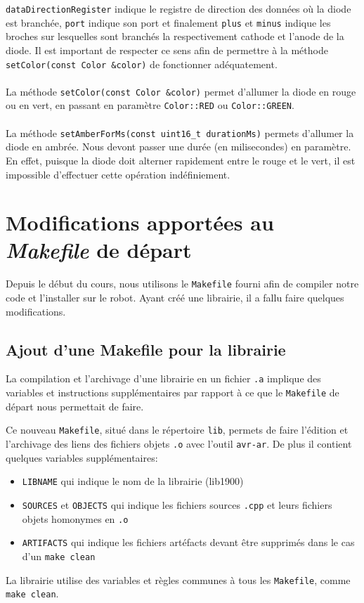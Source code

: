 \documentclass[12pt]{scrartcl}
\begin{document}
\texttt{dataDirectionRegister} indique le registre de direction des données où la
diode est branchée, \texttt{port} indique son port et finalement \texttt{plus}
et \texttt{minus} indique les broches sur lesquelles sont branchés la
respectivement cathode et l'anode de la diode. Il est important de respecter ce
sens afin de permettre à la méthode \texttt{setColor(const Color &color)} de
fonctionner adéquatement.
\\ \\
La méthode \texttt{setColor(const Color &color)} permet d'allumer la diode en rouge
ou en vert, en passant en paramètre \texttt{Color::RED} ou \texttt{Color::GREEN}.
\\ \\
La méthode \texttt{setAmberForMs(const uint16_t durationMs)} permets d'allumer la
diode en ambrée. Nous devont passer une durée (en milisecondes) en paramètre. En
effet, puisque la diode doit alterner rapidement entre le rouge et le vert, il
est impossible d'effectuer cette opération indéfiniement.
\newpage
\section{Modifications apportées au \textit{Makefile} de départ}
Depuis le début du cours, nous utilisons le \texttt{Makefile} fourni afin de
compiler notre code et l'installer sur le robot. Ayant créé une librairie, il a
fallu faire quelques modifications.
\subsection{Ajout d'une Makefile pour la librairie}
La compilation et l'archivage d'une librairie en un fichier \texttt{.a} implique
des variables et instructions supplémentaires par rapport à ce que le
\texttt{Makefile} de départ nous permettait de faire.

Ce nouveau \texttt{Makefile},
situé dans le répertoire \texttt{lib}, permets de faire l'édition et l'archivage
des liens des fichiers objets \texttt{.o} avec l'outil \texttt{avr-ar}. De plus il
contient quelques variables supplémentaires:
\begin{itemize}
    \item \verb|LIBNAME| qui indique le nom de la librairie (lib1900)
    \item \verb|SOURCES| et \verb|OBJECTS| qui indique les fichiers sources \verb|.cpp|
          et leurs fichiers objets homonymes en \verb|.o|
    \item \verb|ARTIFACTS| qui indique les fichiers artéfacts devant être supprimés
          dans le cas d'un \verb|make clean|
\end{itemize}
La librairie utilise des variables et règles communes à tous les \verb|Makefile|,
comme \verb|make clean|.
\end{document}
